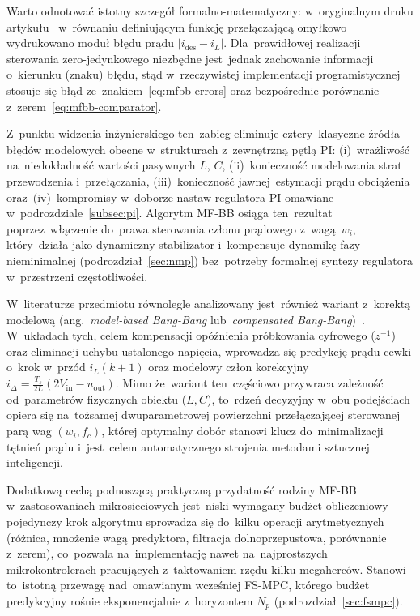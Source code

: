 Warto odnotować istotny szczegół formalno-matematyczny: w~oryginalnym druku artykułu~\cite{tatari2024mfbb} w~równaniu definiującym funkcję przełączającą omyłkowo wydrukowano moduł błędu prądu $\lvert i_{\mathrm{des}} - i_L\rvert$. Dla~prawidłowej realizacji sterowania zero-jedynkowego niezbędne jest~jednak zachowanie informacji o~kierunku (znaku) błędu, stąd w~rzeczywistej implementacji programistycznej stosuje się błąd ze~znakiem~\eqref{eq:mfbb-errors} oraz bezpośrednie porównanie z~zerem~\eqref{eq:mfbb-comparator}.

Z~punktu widzenia inżynierskiego ten~zabieg eliminuje cztery~klasyczne źródła błędów modelowych obecne w~strukturach z~zewnętrzną pętlą PI: (i)~wrażliwość na~niedokładność wartości pasywnych $L$, $C$, (ii)~konieczność modelowania strat przewodzenia i~przełączania, (iii)~konieczność jawnej~estymacji prądu obciążenia oraz~(iv)~kompromisy w~doborze nastaw regulatora PI omawiane w~podrozdziale~\ref{subsec:pi}. Algorytm MF-BB osiąga ten~rezultat poprzez~włączenie do~prawa sterowania członu prądowego z~wagą~$w_i$, który~działa jako dynamiczny stabilizator i~kompensuje dynamikę fazy nieminimalnej (podrozdział~\ref{sec:nmp}) bez~potrzeby formalnej syntezy regulatora w~przestrzeni częstotliwości.

W~literaturze przedmiotu równolegle analizowany jest~również wariant z~korektą modelową (ang.~\emph{model-based Bang-Bang} lub~\emph{compensated Bang-Bang})~\cite{tatari2025enhancedbb}. W~układach tych, celem kompensacji opóźnienia próbkowania cyfrowego ($z^{-1}$) oraz eliminacji uchybu ustalonego napięcia, wprowadza się predykcję prądu cewki o~krok w~przód $i_L(k+1)$ oraz modelowy człon korekcyjny $i_\Delta = \frac{T_s}{2L}(2V_{\mathrm{in}} - u_{\mathrm{out}})$. Mimo że~wariant ten~częściowo przywraca zależność od~parametrów fizycznych obiektu ($L, C$), to~rdzeń decyzyjny w~obu podejściach opiera się na~tożsamej dwuparametrowej powierzchni przełączającej sterowanej parą wag $(w_i, f_c)$, której optymalny dobór stanowi klucz do~minimalizacji tętnień prądu i~jest~celem automatycznego strojenia metodami sztucznej inteligencji.

Dodatkową cechą podnoszącą praktyczną przydatność rodziny MF-BB w~zastosowaniach mikrosieciowych jest~niski wymagany budżet obliczeniowy -- pojedynczy krok algorytmu sprowadza się do~kilku operacji arytmetycznych (różnica, mnożenie wagą predyktora, filtracja dolnoprzepustowa, porównanie z~zerem), co~pozwala na~implementację nawet na~najprostszych mikrokontrolerach pracujących z~taktowaniem rzędu kilku megaherców. Stanowi to~istotną przewagę nad~omawianym wcześniej FS-MPC, którego budżet predykcyjny rośnie eksponencjalnie z~horyzontem $N_p$ (podrozdział~\ref{sec:fsmpc}).

